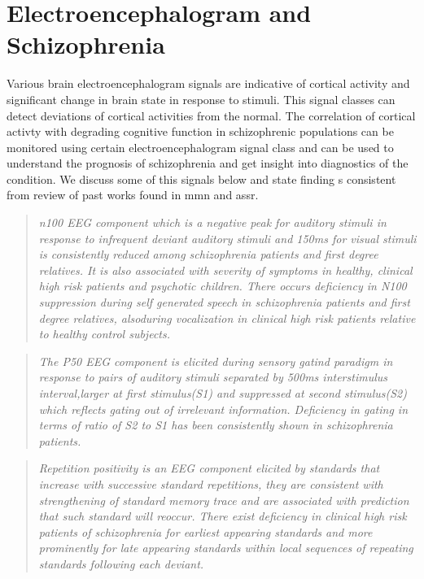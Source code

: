 \section{Electroencephalogram and Schizophrenia}\label{sec:EEG}
Various brain electroencephalogram signals are indicative of cortical activity and significant change in brain state in response to stimuli. This signal classes can detect deviations of cortical activities from the normal. The correlation of cortical activty with degrading cognitive function in schizophrenic populations can be monitored using certain electroencephalogram signal class and can be used to understand the prognosis of schizophrenia and get insight into diagnostics of the condition. We discuss some of this signals below and state finding s consistent from review of past works found in \ac{mmn} and \ac{assr}.
\begin{quotation}
	\textit{\ac{n100} EEG component which is a negative peak for auditory stimuli in response to infrequent deviant auditory stimuli and 150ms for visual stimuli is consistently reduced among schizophrenia patients and first degree relatives. It is also associated with severity of symptoms in healthy, clinical high risk patients and psychotic children. There occurs deficiency in N100 suppression during self generated speech in schizophrenia patients and first degree relatives, alsoduring vocalization in clinical high risk patients relative to healthy control subjects.}
	\begin{flushright}
		\cite{hamilton2020electroencephalography}
	\end{flushright}
\end{quotation}
\begin{quotation}
	\textit{The P50 EEG component is elicited during sensory gatind paradigm in response to pairs of auditory stimuli separated by 500ms interstimulus interval,larger at first stimulus(S1) and suppressed at second stimulus(S2) which reflects gating out of irrelevant information. Deficiency in gating in terms of ratio of S2 to S1 has been consistently shown in schizophrenia patients.}
	\begin{flushright}
		\cite{hamilton2020electroencephalography}
	\end{flushright}
\end{quotation}
\begin{quotation}
	\textit{Repetition positivity is an EEG component elicited by standards that increase with successive standard repetitions, they are consistent with strengthening of standard memory trace and are associated with prediction that such standard will reoccur. There exist deficiency in clinical high risk patients of schizophrenia for earliest appearing standards and more prominently for late appearing standards within local sequences of repeating standards following each deviant.}
	\begin{flushright}
		\cite{hamilton2020electroencephalography}
	\end{flushright}
\end{quotation}
